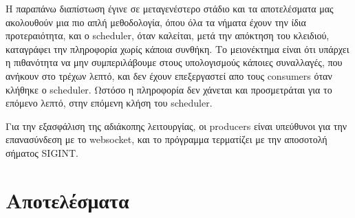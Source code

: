 \documentclass[12pt, a4paper]{article}
\begin{document}
Η παραπάνω διαπίστωση έγινε σε μεταγενέστερο στάδιο και τα αποτελέσματα μας ακολουθούν μια πιο απλή μεθοδολογία, όπου όλα τα νήματα έχουν την ίδια προτεραιότητα, και ο scheduler, όταν καλείται, μετά την απόκτηση του κλειδιού, καταγράφει την πληροφορία χωρίς κάποια συνθήκη. Το μειονέκτημα είναι ότι υπάρχει η πιθανότητα να μην συμπεριλάβουμε στους υπολογισμούς κάποιες συναλλαγές, που ανήκουν στο τρέχων λεπτό, και δεν έχουν επεξεργαστεί απο τους consumers όταν κλήθηκε ο scheduler. Ωστόσο η πληροφορία δεν χάνεται και προσμετράται για το επόμενο λεπτό, στην επόμενη κλήση του scheduler.

Για την εξασφάλιση της αδιάκοπης λειτουργίας, οι producers είναι υπεύθυνοι για την επανασύνδεση με το websocket, και το πρόγραμμα τερματίζει με την αποσοτολή σήματος SIGINT.

\clearpage

\section{Αποτελέσματα}
\end{document}
